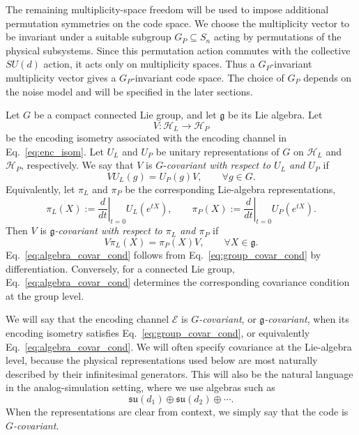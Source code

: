 \documentclass[10pt,twocolumn,superscriptaddress,aps,amsmath,amssymb,citeautoscript,floatfix,prx,longbibliography]{revtex4-2}
\newcounter{alg}
\theoremstyle{plain}
\theoremstyle{plain}
\theoremstyle{plain}
\theoremstyle{plain}
\theoremstyle{plain}
\theoremstyle{plain}
\begin{document}
The remaining multiplicity-space freedom will be used to impose additional permutation symmetries on the code space. We choose the multiplicity vector to be invariant under a suitable subgroup $G_P\subseteq S_n$ acting by permutations of the physical subsystems. Since this permutation action commutes with the collective $SU(d)$ action, it acts only on multiplicity spaces. Thus a $G_P$-invariant multiplicity vector gives a $G_P$-invariant code space. The choice of $G_P$ depends on the noise model and will be specified in the later sections.

Let $G$ be a compact connected Lie group, and let $\mathfrak g$ be its Lie algebra. Let
$$
    V:\mathcal H_L\to\mathcal H_P
$$
be the encoding isometry associated with the encoding channel in Eq.~\eqref{eq:enc_isom}. Let $U_L$ and $U_P$ be unitary representations of $G$ on $\mathcal H_L$ and $\mathcal H_P$, respectively. We say that $V$ is $G$-\textit{covariant with respect to $U_L$ and $U_P$} if
\begin{equation}\label{eq:group_covar_cond}
    VU_L(g)
    =
    U_P(g)V,
    \qquad
    \forall g\in G .
\end{equation}
Equivalently, let $\pi_L$ and $\pi_P$ be the corresponding Lie-algebra representations,
$$
    \pi_L(X)
    :=
    \left.\frac{d}{dt}\right|_{t=0}
    U_L(e^{tX}),
    \qquad
    \pi_P(X)
    :=
    \left.\frac{d}{dt}\right|_{t=0}
    U_P(e^{tX}).
$$
Then $V$ is \textit{$\mathfrak g$-covariant with respect to $\pi_L$ and $\pi_P$} if
\begin{equation}\label{eq:algebra_covar_cond}
    V\pi_L(X)
    =
    \pi_P(X)V,
    \qquad
    \forall X\in\mathfrak g .
\end{equation}
Eq.~\eqref{eq:algebra_covar_cond} follows from Eq.~\eqref{eq:group_covar_cond} by differentiation. Conversely, for a connected Lie group, Eq.~\eqref{eq:algebra_covar_cond} determines the corresponding covariance condition at the group level.

We will say that the encoding channel $\mathcal E$ is \textit{$G$-covariant}, or \textit{$\mathfrak g$-covariant}, when its encoding isometry satisfies Eq.~\eqref{eq:group_covar_cond}, or equivalently Eq.~\eqref{eq:algebra_covar_cond}. We will often specify covariance at the Lie-algebra level, because the physical representations used below are most naturally described by their infinitesimal generators. This will also be the natural language in the analog-simulation setting, where we use algebras such as
$$
    \mathfrak{su}(d_1)
    \oplus
    \mathfrak{su}(d_2)
    \oplus
    \cdots .
$$
When the representations are clear from context, we simply say that the code is \textit{$G$-covariant}.
\end{document}
